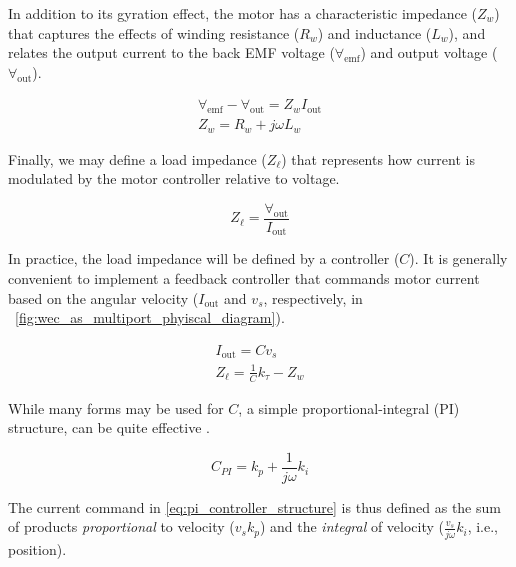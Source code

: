 \documentclass[lettersize,journal]{IEEEtran}
\newcommand{\rc}[1]{\textcolor{red}{#1}}
\begin{document}
\noindent{}In addition to its gyration effect, the motor has a characteristic impedance ($Z_w$) that captures the effects of winding resistance ($R_w$) and inductance ($L_w$), and relates the output current to the back EMF voltage ($\forall_{\textrm{emf}}$) and output voltage ($\forall_{\textrm{out}}$).

\begin{subequations}
        \begin{gather}
                \forall_{\textrm{emf}} - \forall_{\textrm{out}} = Z_w I_{\textrm{out}}\\
                Z_w = R_w + j \omega L_w \label{eq:winding_impedance}
        \end{gather}
\end{subequations}

Finally, we may define a load impedance ($Z_\ell$) that represents how current is modulated by the motor controller relative to voltage.

\begin{equation}
        Z_\ell = \frac{\forall_{\textrm{out}}}{I_{\textrm{out}}}
        \label{eq:load_impedance}
\end{equation}

\noindent{}In practice, the load impedance will be defined by a controller ($C$).
It is generally convenient to implement a feedback controller that commands motor current based on the angular velocity ($I_{\textrm{out}}$ and $v_s$, respectively, in \figurename~\ref{fig:wec_as_multiport_phyiscal_diagram}).

\begin{subequations}
\begin{gather}
        I_{\textrm{out}} = C v_s \\  
        Z_\ell = \frac{1}{C} k_\tau - Z_w     
\end{gather}
\end{subequations}

\noindent{}While many forms may be used for $C$, a simple proportional-integral (PI) structure, can be quite effective \cite{Coe2020a}.

\begin{equation}
        C_{PI} = k_p + \frac{1}{j \omega} k_i 
        \label{eq:pi_controller_structure}
\end{equation}

\noindent{}The current command in \eqref{eq:pi_controller_structure} is thus defined as the sum of products \emph{proportional} to velocity ($v_s k_p$) and the \emph{integral} of velocity ($\frac{v_s}{j \omega} k_i$, i.e., position).
\end{document}
